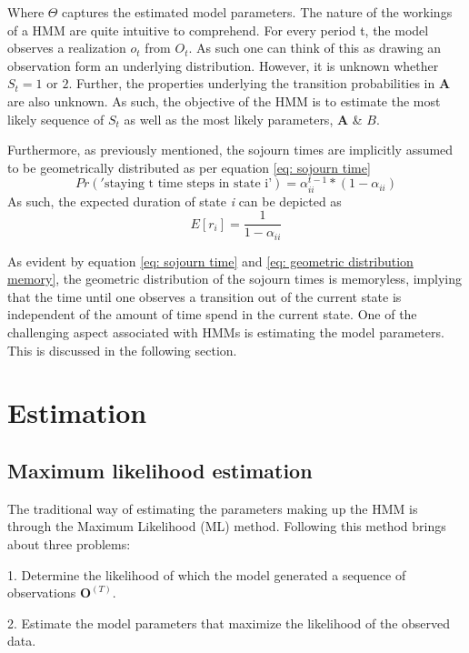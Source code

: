 Where $\Theta$ captures the estimated model parameters. The nature of the workings of a HMM are quite intuitive to comprehend. For every period t, the model observes a realization $o_t$ from $O_t$. As such one can think of this as drawing an observation form an underlying distribution. However, it is unknown whether $S_t = 1$ or $2$. Further, the properties underlying the transition probabilities in $\mathbf{A}$ are also unknown. As such, the objective of the HMM is to estimate the most likely sequence of $S_t$ as well as the most likely parameters, $\mathbf{A}$ \& $B$. 

Furthermore, as previously mentioned, the sojourn times are implicitly assumed to be geometrically distributed as per equation \ref{eq: sojourn time}
\begin{equation}
    Pr('\text{staying t time steps in state i'}) = \alpha^{t-1}_{ii} *(1-\alpha_{ii})
    \label{eq: sojourn time}
\end{equation}
As such, the expected duration of state \textit{i} can be depicted as 
\begin{equation}
    E[r_i] = \frac{1}{1-\alpha_{ii}}
    \label{eq: geometric distribution memory}
\end{equation}

As evident by equation \ref{eq: sojourn time} and \ref{eq: geometric distribution memory}, the geometric distribution of the sojourn times is memoryless, implying that the time until one observes a transition out of the current state is independent of the amount of time spend in the current state. One of the challenging aspect associated with HMMs is estimating the model parameters. This is discussed in the following section.

\section{Estimation}

\subsection{Maximum likelihood estimation}
The traditional way of estimating the parameters making up the HMM is through the Maximum Likelihood
(ML) method. Following this method brings about three problems:

    1. Determine the likelihood of which the model generated a sequence of  observations $\mathbf{O}^{(T)}$. 
    
    2. Estimate the model parameters that maximize the likelihood of the observed data.

